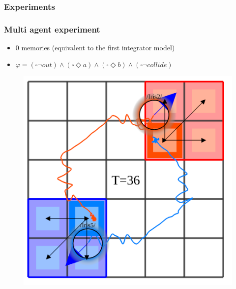 \documentclass{beamer}
\newcommand{\LTLalways}		{\ensuremath{\square}}
\newcommand{\LTLeventually}	{\ensuremath{\Diamond}}
\renewcommand{\and}			{\ensuremath{\wedge}}
\begin{document}
\begin{frame}
\frametitle{Experiments}
\end{frame}



\begin{frame}
\frametitle{Multi agent experiment}
\begin{itemize}
\item 0 memories (equivalent to the first integrator model)
\item $\varphi = (\LTLalways \neg out) \and (\LTLalways \LTLeventually a) \and (\LTLalways \LTLeventually b) \and (\LTLalways \neg collide)$
\end{itemize}

\begin{figure}
  \begin{minipage}{0.3\textwidth}
    \centering
    \includegraphics[width=\linewidth]{multi_ltl/multi11}
  \end{minipage} 
  \begin{minipage}{0.3\textwidth}
    \centering

\end{minipage}
\end{figure}
\end{frame}
\end{document}

